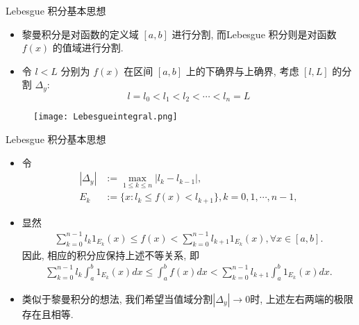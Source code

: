 \begin{frame}{{\rm Lebesgue} 积分基本思想}

	\begin{itemize}[<+-|alert@+>]
		\item 黎曼积分是对函数的定义域 $[a,b]$ 进行分割, 而{\rm Lebesgue} 积分则是对函数 $f(x)$ 的值域进行分割.
		\item  令 $l<L$ 分别为 $f(x)$ 在区间 $[a,b]$ 上的下确界与上确界, 考虑 $[l,L]$ 的分割 $\Delta_y$:
		\[l=l_0<l_1<l_2<\cdots<l_n=L\]

	\end{itemize}
	\pause
	\begin{figure}[htbp]
		\centering
		\texttt{[image: Lebesgueintegral.png]}
	\end{figure}
\end{frame}
\begin{frame}{{\rm Lebesgue} 积分基本思想}

	\begin{itemize}[<+-|alert@+>]
		\item 令
		\begin{align*}
			|\Delta_y|&:=\max_{1\leq k\leq n}|l_k-l_{k-1}|, \\
			E_k&:=\{x:l_k\leq f(x)<l_{k+1}\}, k=0,1,\cdots, n-1,
		\end{align*}
		\item 显然
		\begin{align*}
			\sum_{k=0}^{n-1}l_k1_{E_k}(x)\leq f(x)<\sum_{k=0}^{n-1}l_{k+1}1_{E_k}(x), \forall x\in [a,b].
		\end{align*}
		因此, 相应的积分应保持上述不等关系, 即
		\begin{align*}
			\sum_{k=0}^{n-1}l_k\int_{a}^{b} 1_{E_k}(x)dx\leq \int_{a}^{b}f(x)dx<\sum_{k=0}^{n-1}l_{k+1}\int_{a}^{b}1_{E_k}(x)dx.
		\end{align*}
		\item 类似于黎曼积分的想法, 我们希望当值域分割$|\Delta_y|\to 0$时, 上述左右两端的极限存在且相等.
	\end{itemize}

\end{frame}


